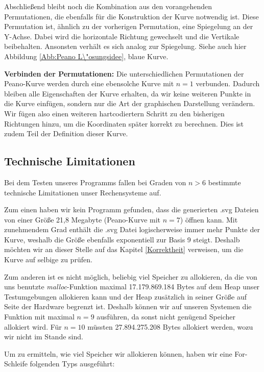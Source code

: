 \documentclass[course=asp]{aspdoc}
\begin{document}
Abschlie\ss end bleibt noch die Kombination aus den vorangehenden Permutationen, die ebenfalls f\"ur die Konstruktion der Kurve notwendig ist. Diese Permutation ist, \"ahnlich zu der vorherigen Permutation, eine Spiegelung an der Y-Achse. Dabei wird die horizontale Richtung gewechselt und die Vertikale beibehalten. Ansonsten verh\"alt es sich analog zur Spiegelung.
Siehe auch hier Abbildung \ref{Abb:Peano L\"osungsidee}, blaue Kurve.

\textbf{Verbinden der Permutationen: }
Die unterschiedlichen Permutationen der Peano-Kurve werden durch eine ebensolche Kurve mit $n = 1$ verbunden. Dadurch bleiben alle Eigenschaften der Kurve erhalten, da wir keine weiteren Punkte in die Kurve einf\"ugen, sondern nur die Art der graphischen Darstellung ver\"andern. Wir f\"ugen also einen weiteren hartcodiertern Schritt zu den bisherigen Richtungen hinzu, um die Koordinaten sp\"ater korrekt zu berechnen. Dies ist zudem Teil der Definition dieser Kurve.  


\subsection{Technische Limitationen} \label{Technische Limitationen} %
Bei dem Testen unseres Programms fallen bei Graden von $n > 6$ bestimmte technische Limitationen unser Rechensysteme auf. 

Zum einen haben wir kein Programm gefunden, dass die generierten .svg Dateien von einer Gr\"o\ss e 21,8 Megabyte (Peano-Kurve mit $n = 7$) \"offnen kann. Mit zunehmendem Grad enth\"alt die .svg Datei logischerweise immer mehr Punkte der Kurve, weshalb die Gr\"o\ss e ebenfalls exponentiell zur Basis 9 steigt. Deshalb m\"ochten wir an dieser Stelle auf das Kapitel \ref{Korrektheit} verweisen, um die Kurve auf selbige zu pr\"ufen.  %

Zum anderen ist es nicht m\"oglich, beliebig viel Speicher zu allokieren, da die von uns benutzte \textit{malloc}-Funktion maximal 17.179.869.184 Bytes auf dem Heap unser Testumgebungen allokieren kann und der Heap zus\"atzlich in seiner Gr\"o\ss e auf Seite der Hardware begrenzt ist. Deshalb k\"onnen wir auf unseren Systemen die Funktion mit maximal $n = 9$ ausf\"uhren, da sonst nicht gen\"ugend Speicher allokiert wird. F\"ur $n = 10$ m\"ussten 27.894.275.208 Bytes allokiert werden, wozu wir nicht im Stande sind. 

Um zu ermitteln, wie viel Speicher wir allokieren k\"onnen, haben wir eine For-Schleife folgenden Typs ausgef\"uhrt:
\end{document}
